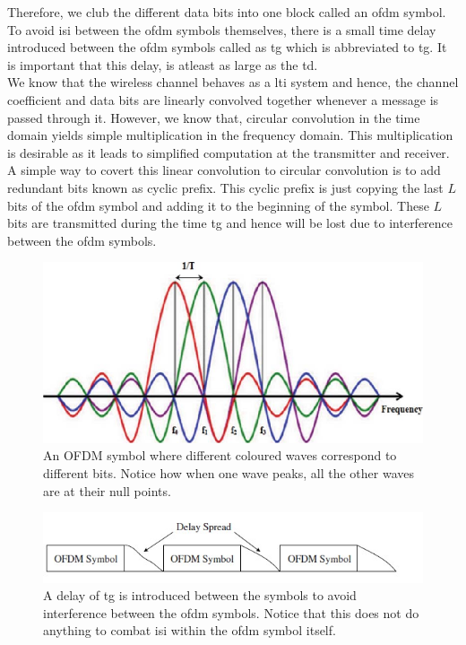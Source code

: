 Therefore, we club the different data bits into one block called an \acrshort{ofdm} symbol. To avoid \acrshort{isi} between the \acrshort{ofdm} symbols themselves, there is a small time delay introduced between the \acrshort{ofdm} symbols called as \acrlong{tg} which is abbreviated to \acrshort{tg}. It is important that this delay, is atleast as large as the \acrlong{td}.\\
We know that the wireless channel behaves as a \acrlong{lti} system and hence, the channel coefficient and data bits are linearly convolved together whenever a message is passed through it. However, we know that, circular convolution in the time domain yields simple multiplication in the frequency domain. This multiplication is desirable as it leads to simplified computation at the transmitter and receiver. A simple way to covert this linear convolution to circular convolution is to add redundant bits known as \gls{cyclic prefix}. This cyclic prefix is just copying the last $L$ bits of the \acrshort{ofdm} symbol and adding it to the beginning of the symbol. These $L$ bits are transmitted during the time \acrshort{tg} and hence will be lost due to interference between the \acrshort{ofdm} symbols.\\

\begin{figure}[!htbp]
\centering
\includegraphics[scale=1]{Chapter 2/Figures/OFDM Orthogonality}
\caption[Orthogonality in OFDM]{An OFDM symbol where different coloured waves correspond to different bits. Notice how when one wave peaks, all the other waves are at their null points.}
\label{fig:ofdm orthogonal waves}
\end{figure}

\begin{figure}[!htbp]
\centering
\includegraphics[scale=1]{Chapter 2/Figures/OFDM Symbol Timing}
\caption[Guard Time between OFDM symbols]{A delay of \acrshort{tg} is introduced between the symbols to avoid interference between the \acrshort{ofdm} symbols. Notice that this does not do anything to combat \acrshort{isi} within the \acrshort{ofdm} symbol itself.}
\label{fig:ofdm symbol timing}
\end{figure}

